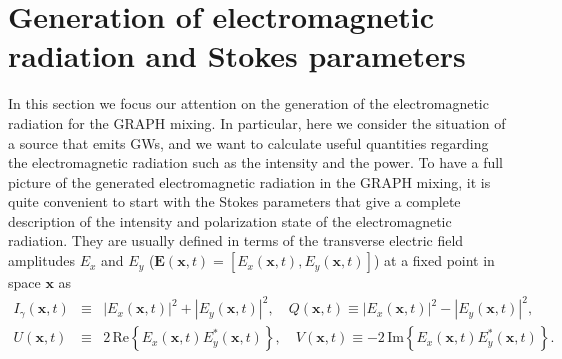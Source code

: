 \documentclass[a4paper,11pt]{article}
\newcommand{\bs}{\boldsymbol}
\begin{document}
\section{Generation of electromagnetic radiation and Stokes parameters}
\label{sec:5}

In this section we focus our attention on the  generation of the electromagnetic radiation for the GRAPH mixing. In particular, here we consider the situation of a source that emits GWs, and we want to calculate useful quantities regarding the electromagnetic radiation such as the intensity and the power. To have a full picture of the generated electromagnetic radiation in the GRAPH mixing, it is quite convenient to start with the Stokes parameters that give a complete description of the intensity and polarization state of the electromagnetic radiation. They are usually defined in terms of the transverse electric field amplitudes $E_x$ and $E_y$ ($\bs E(\bs x, t)= [E_x(\bs x, t), E_y(\bs x, t)]$) at a fixed point in space $\bs x$ as 
\begin{eqnarray}\label{Stokes-par}
I_\gamma(\bs x, t) & \equiv & |E_x(\bs x, t)|^2+|E_y(\bs x, t)|^2, \quad Q(\bs x, t) \equiv |E_x(\bs x, t)|^2-|E_y(\bs x, t)|^2,\nonumber\\
 U(\bs x, t) & \equiv & 2\,\text{Re}\left\{E_x(\bs x, t)E_y^*(\bs x, t) \right\}, \quad  V(\bs x, t) \equiv -2\,\text{Im}\left\{E_x(\bs x, t)E_y^*(\bs x, t) \right\}.
 \end{eqnarray}
\end{document}
